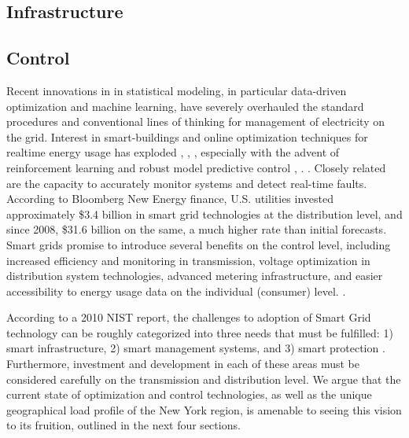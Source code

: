 \documentclass[plain]{article}
\newcommand{\1}{\mathbbm{1}}
\begin{document}
\subsection{Infrastructure}

\subsection{Control}
Recent innovations in in statistical modeling, in particular data-driven optimization and machine learning, have severely overhauled the standard procedures and conventional lines of thinking for management of electricity on the grid. Interest in smart-buildings and online optimization techniques for realtime energy usage has exploded \cite{yu_review_2021}, \cite{khan_modeling_2022}, \cite{sembroiz_planning_2019}, especially with the advent of reinforcement learning and robust model predictive control \cite{chen_efficient_2020}, \cite{yang_adaptive_2019}. . Closely related are the capacity to accurately monitor systems and detect real-time faults. According to Bloomberg New Energy finance, U.S. utilities invested approximately  \$3.4 billion in smart grid technologies at the distribution level, and since 2008, \$31.6 billion on the same, a much higher rate than initial forecasts. Smart grids promise to introduce several benefits on the control level, including increased efficiency and monitoring in transmission, voltage optimization in distribution system technologies, advanced metering infrastructure, and easier accessibility to energy usage data on the individual (consumer) level. \cite{cite energy.gov}. 


According to a 2010 NIST report, the challenges to adoption of Smart Grid technology can be roughly categorized into three needs that must be fulfilled: 1) smart infrastructure, 2) smart management systems, and 3) smart protection \cite{moreno_escobar_comprehensive_2021-1}. Furthermore, investment and development in each of these areas must be considered carefully on the transmission and distribution level. We argue that the current state of optimization and control technologies, as well as the unique geographical load profile of the New York region, is amenable to seeing this vision to its fruition, outlined in the next four sections.
\end{document}
